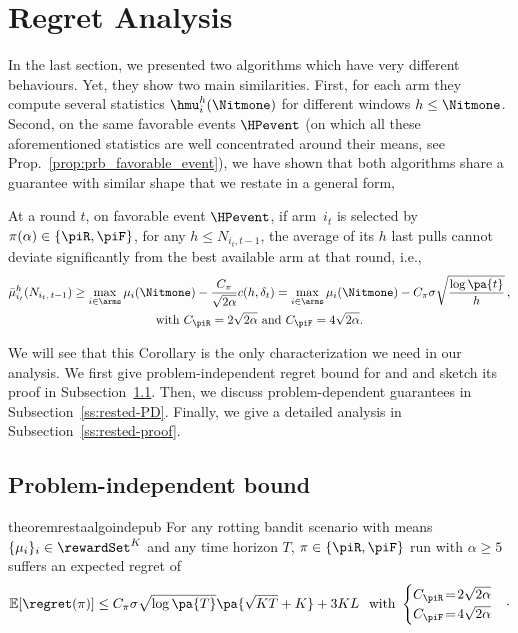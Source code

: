 \section{Regret Analysis}\label{sec:theory}

In the last section, we presented two algorithms which have very different behaviours. Yet, they show two main similarities. First, for each arm they compute several statistics $\hmu_i^h(\Nitmone)$ for different windows $h\leq \Nitmone$. Second, on the same favorable events $\HPevent$ (on which all these aforementioned statistics are well concentrated around their means, see Prop.~\ref{prop:prb_favorable_event}), we have shown that both algorithms share a guarantee with similar shape that we restate in a general form,
\begin{corollary}
\label{cor:core-RAW-FEWA}
At a round $t$, on favorable event $\HPevent$, if arm~$i_{t}$ is selected by $\pi(\alpha) \in \left\{ \piR, \piF\right\}$, for any $h \leq N_{i_t,t-1}$,  the average of its $h$ last pulls cannot deviate significantly from the best available arm at that round, i.e.,
%
\begin{multline*}
\bar{\mu}_{i_t}^{h}(N_{i_t,\, t-1}) \geq \max_{i \in \arms} \mu_{i}(\Nitmone) - \frac{C_\pi}{\sqrt{2\alpha}} c(h, \delta_t) = \max_{i \in \arms} \mu_{i}(\Nitmone) - C_\pi \sigma\sqrt{\frac{\log\pa{t}}{h}}\,,\\
\text{with } C_{\piR} = 2\sqrt{2\alpha} \text{ and } C_{\piF} = 4\sqrt{2\alpha}.
\end{multline*}
\end{corollary}

We will see that this Corollary is the only characterization we need in our analysis. We first give problem-independent regret bound for \FEWA and \RUCB and sketch its proof in Subsection~\ref{ss:rested-PI}. Then, we discuss problem-dependent guarantees in Subsection~\ref{ss:rested-PD}. Finally, we give a detailed analysis in Subsection~\ref{ss:rested-proof}.


\subsection{Problem-independent bound}
\label{ss:rested-PI}
\begin{restatable}{theorem}{restaalgoindepub}
\label{th:rested-PI}
For any rotting bandit scenario with means $\{\mu_i\}_{i} \in \rewardSet^K$ and any time horizon $T$, $\pi \in \left\{\piR, \piF \right\}$ run with $\alpha \geq 5$ suffers an expected regret of
\begin{equation*}
\mathbb{E}[\regret(\pi)] \leq C_\pi \sigma \sqrt{\log\pa{T}}\pa{\sqrt{KT} +K} + 3KL\, \;\; \text{with } 
\begin{cases}
C_{\piR} \!=\! 2\sqrt{2\alpha}\\
C_{\piF} \!=\! 4\sqrt{2\alpha}
\end{cases}\!\cdot
\end{equation*}
\end{restatable}
